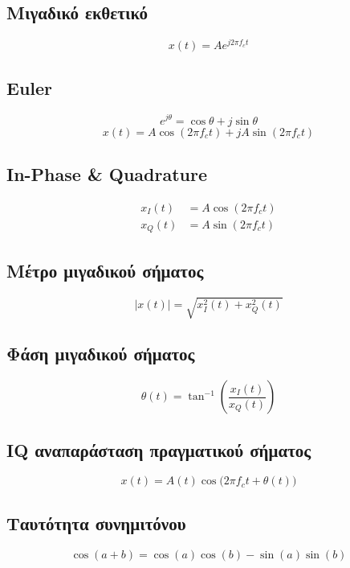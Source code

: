 \documentclass[11pt,a4paper]{article}
\begin{document}
\subsection{Μιγαδικό εκθετικό}
\begin{equation}
x(t) = A e^{j2\pi f_c t}
\end{equation}

\subsection{Euler}
\begin{equation}
e^{j\theta} = \cos\theta + j\sin\theta
\end{equation}
\begin{equation}
x(t) = A\cos(2\pi f_c t) + jA\sin(2\pi f_c t)
\end{equation}

\subsection{In-Phase \& Quadrature}
\begin{align}
x_I(t) &= A\cos(2\pi f_c t) \\
x_Q(t) &= A\sin(2\pi f_c t)
\end{align}

\subsection{Μέτρο μιγαδικού σήματος}
\begin{equation}
|x(t)| = \sqrt{x_I^2(t) + x_Q^2(t)}
\end{equation}

\subsection{Φάση μιγαδικού σήματος}
\begin{equation}
\theta(t) = \tan^{-1}\!\left(\frac{x_I(t)}{x_Q(t)}\right)
\end{equation}

\subsection{IQ αναπαράσταση πραγματικού σήματος}
\begin{equation}
x(t) = A(t)\cos\bigl(2\pi f_c t + \theta(t)\bigr)
\end{equation}

\subsection{Ταυτότητα συνημιτόνου}
\begin{equation}
\cos(a+b) = \cos(a)\cos(b) - \sin(a)\sin(b)
\end{equation}
\end{document}
